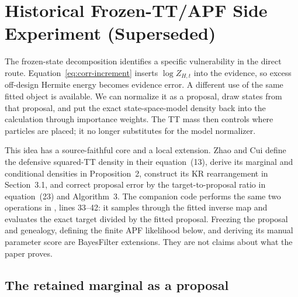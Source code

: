 \documentclass[11pt]{article}
\begin{document}
\iffalse
\section{Historical Frozen-TT/APF Side Experiment (Superseded)}
\label{sec:frozen-proposal}

The frozen-state decomposition identifies a specific vulnerability in the
direct route. Equation~\eqref{eq:corr-increment} inserts $\log Z_{H,t}$ into
the evidence, so excess off-design Hermite energy becomes evidence error. A
different use of the same fitted object is available. We can normalize it as a
proposal, draw states from that proposal, and put the exact state-space-model
density back into the calculation through importance weights. The TT mass then
controls where particles are placed; it no longer substitutes for the model
normalizer.

This idea has a source-faithful core and a local extension. Zhao and Cui define
the defensive squared-TT density in their equation~(13), derive its marginal
and conditional densities in Proposition~2, construct its KR rearrangement in
Section~3.1, and correct proposal error by the target-to-proposal ratio in
equation~(23) and Algorithm~3. The companion code performs the same two
operations in , lines 33--42: it samples through the
fitted inverse map and evaluates the exact target divided by the fitted
proposal. Freezing the proposal and genealogy, defining the finite APF
likelihood below, and deriving its manual parameter score are BayesFilter
extensions. They are not claims about what the paper proves.

\subsection{The retained marginal as a proposal}
\end{document}
